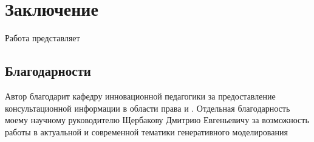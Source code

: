 \section{Заключение}

Работа представляет

\subsection{Благодарности}

Автор благодарит кафедру инновационной педагогики за предоставление консультационной информации в области права
и . Отдельная благодарность моему научному руководителю Щербакову Дмитрию Евгеньевичу
за возможность работы в актуальной и современной тематики генеративного моделирования